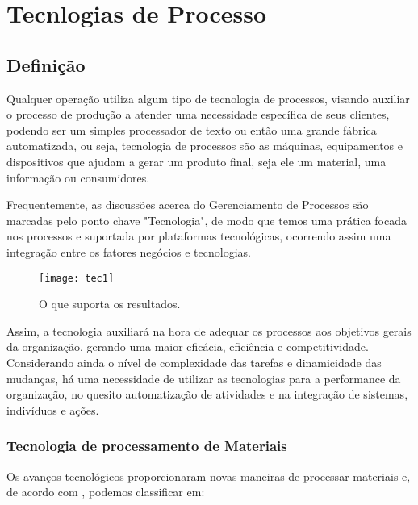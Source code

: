 \chapter[Tecnlogias de Processo]{Tecnlogias de Processo}
\label{chap:tecnologias}
	
	\section[Definição]{Definição}
	\label{sec:tecnologias_definicao}

		Qualquer operação utiliza algum tipo de tecnologia de processos, visando auxiliar o processo de produção a atender uma necessidade específica de seus clientes, podendo ser um simples processador de texto ou então uma grande fábrica automatizada, ou seja, tecnologia de processos são as máquinas, equipamentos e dispositivos que ajudam a gerar um produto final, seja ele um material, uma informação ou consumidores.\cite{slack}

		Frequentemente, as discussões acerca do Gerenciamento de Processos são marcadas pelo ponto chave "Tecnologia", de modo que temos uma prática focada nos processos e suportada por plataformas tecnológicas, ocorrendo assim uma integração entre os fatores negócios e tecnologias.\cite{lecom} 

		\begin{figure}[h]
			\centering
			\texttt{[image: tec1]}
			\caption[O que suporta os resultados]{O que suporta os resultados.}
			\label{fig:tec1}
		\end{figure}

		Assim, a tecnologia auxiliará na hora de adequar os processos aos objetivos gerais da organização, gerando uma maior eficácia, eficiência e competitividade. Considerando ainda o nível de complexidade das tarefas e dinamicidade das mudanças, há uma necessidade de utilizar as tecnologias para a performance da organização, no quesito automatização de atividades e na integração de sistemas, indivíduos e ações. 

		\subsection[Tecnologia de processamento de Materiais]{Tecnologia de processamento de Materiais}
		\label{sec:tecnologias_definicao_materiais}

			Os avanços tecnológicos proporcionaram novas maneiras de processar materiais e, de acordo com \cite{slack}, podemos classificar em:

